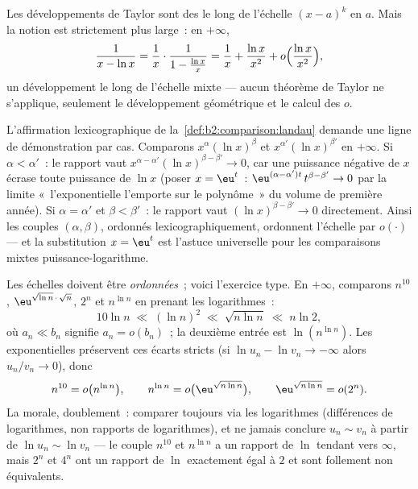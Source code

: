 \begin{example}
Les développements de Taylor sont des  le
long de l'échelle $(x - a)^k$ en $a$. Mais la notion est strictement
plus large~: en $+\infty$,
\[
\frac{1}{x - \ln x}
= \frac1x \cdot \frac{1}{1 - \frac{\ln x}{x}}
= \frac1x + \frac{\ln x}{x^2} + o\Bigl(\frac{\ln x}{x^2}\Bigr),
\]
un développement le long de l'échelle mixte --- aucun théorème de
Taylor ne s'applique, seulement le développement géométrique et le
calcul des $o$.
\end{example}

\begin{example}\label{ex:b2:comparison:scaleorder}
L'affirmation lexicographique de la~\cref{def:b2:comparison:landau}
demande une ligne de démonstration par cas. Comparons
$x^{\alpha}(\ln x)^{\beta}$ et $x^{\alpha'}(\ln x)^{\beta'}$
en $+\infty$. Si $\alpha < \alpha'$~: le rapport vaut
$x^{\alpha - \alpha'}(\ln x)^{\beta - \beta'} \to 0$, car une
puissance négative de $x$ écrase toute puissance de $\ln x$ (poser $x =
\eu^t$~: $\eu^{(\alpha - \alpha')t}\,t^{\beta - \beta'} \to 0$
par la limite «~l'exponentielle l'emporte sur le polynôme~» du volume
de première année). Si $\alpha = \alpha'$ et $\beta < \beta'$~: le
rapport vaut $(\ln x)^{\beta - \beta'} \to 0$ directement. Ainsi les
couples $(\alpha, \beta)$, ordonnés lexicographiquement, ordonnent
l'échelle par $o(\cdot)$ --- et la substitution $x = \eu^t$ est
l'astuce universelle pour les comparaisons mixtes
puissance-logarithme.
\end{example}

\begin{example}\label{ex:b2:comparison:ranking}
Les échelles doivent être \emph{ordonnées}~; voici l'exercice type. En
$+\infty$, comparons $n^{10}$, $\eu^{\sqrt{\ln n}\,\cdot\,\sqrt n}$,
$2^n$ et $n^{\ln n}$ en prenant les logarithmes~:
\[
10\ln n
\;\ll\; (\ln n)^2
\;\ll\; \sqrt{n\ln n}
\;\ll\; n\ln 2 ,
\]
où $a_n \ll b_n$ signifie $a_n = o(b_n)$~; la deuxième entrée est
$\ln(n^{\ln n})$. Les exponentielles préservent ces écarts stricts (si
$\ln u_n - \ln v_n \to -\infty$ alors $u_n/v_n \to 0$), donc
\[
n^{10} = o\bigl(n^{\ln n}\bigr),
\qquad
n^{\ln n} = o\bigl(\eu^{\sqrt{n\ln n}}\bigr),
\qquad
\eu^{\sqrt{n\ln n}} = o(2^n) .
\]
La morale, doublement~: comparer toujours via les logarithmes
(différences de logarithmes, non rapports de logarithmes), et ne
jamais conclure $u_n \sim v_n$ à partir de $\ln u_n \sim \ln v_n$ ---
le couple $n^{10}$ et $n^{\ln n}$ a un rapport de $\ln$ tendant vers
$\infty$, mais $2^n$ et $4^n$ ont un rapport de $\ln$ exactement égal à
$2$ et sont follement non équivalents.
\end{example}

